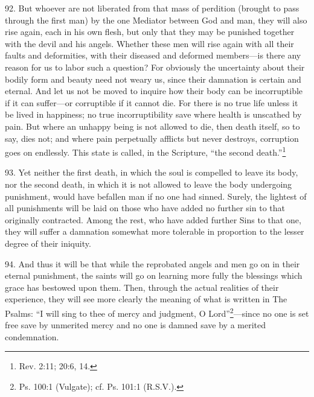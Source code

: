 92. But whoever are not liberated from that mass of perdition (brought to pass through the first man) by the one Mediator between God and man, they will also rise again, each in his own flesh, but only that they may be punished together with the devil and his angels. Whether these men will rise again with all their faults and deformities, with their diseased and deformed members—is there any reason for us to labor such a question? For obviously the uncertainty about their bodily form and beauty need not weary us, since their damnation is certain and eternal. And let us not be moved to inquire how their body can be incorruptible if it can suffer—or corruptible if it cannot die. For there is no true life unless it be lived in happiness; no true incorruptibility save where health is unscathed by pain. But where an unhappy being is not allowed to die, then death itself, so to say, dies not; and where pain perpetually afflicts but never destroys, corruption goes on endlessly. This state is called, in the Scripture, ``the second death.''\footnote{Rev. 2:11; 20:6, 14.}

93. Yet neither the first death, in which the soul is compelled to leave its body, nor the second death, in which it is not allowed to leave the body undergoing punishment, would have befallen man if no one had sinned. Surely, the lightest of all punishments will be laid on those who have added no further sin to that originally contracted. Among the rest, who have added further Sins to that one, they will suffer a damnation somewhat more tolerable in proportion to the lesser degree of their iniquity.


94. And thus it will be that while the reprobated angels and men go on in their eternal punishment, the saints will go on learning more fully the blessings which grace has bestowed upon them. Then, through the actual realities of their experience, they will see more clearly the meaning of what is written in The Psalms: ``I will sing to thee of mercy and judgment, O Lord''\footnote{Ps. 100:1 (Vulgate); cf. Ps. 101:1 (R.S.V.).}—since no one is set free save by unmerited mercy and no one is damned save by a merited condemnation.

